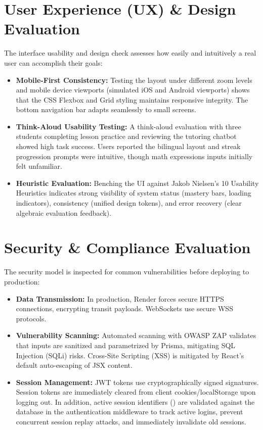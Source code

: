 \section{User Experience (UX) \& Design Evaluation}

The interface usability and design check assesses how easily and intuitively a real user can accomplish their goals:
\begin{itemize}
  \item \textbf{Mobile-First Consistency:} Testing the layout under different zoom levels and mobile device viewports (simulated iOS and Android viewports) shows that the CSS Flexbox and Grid styling maintains responsive integrity. The bottom navigation bar adapts seamlessly to small screens.
  \item \textbf{Think-Aloud Usability Testing:} A think-aloud evaluation with three students completing lesson practice and reviewing the tutoring chatbot showed high task success. Users reported the bilingual layout and streak progression prompts were intuitive, though math expressions inputs initially felt unfamiliar.
  \item \textbf{Heuristic Evaluation:} Benching the UI against Jakob Nielsen's 10 Usability Heuristics indicates strong visibility of system status (mastery bars, loading indicators), consistency (unified design tokens), and error recovery (clear algebraic evaluation feedback).
\end{itemize}

\section{Security \& Compliance Evaluation}

The security model is inspected for common vulnerabilities before deploying to production:
\begin{itemize}
  \item \textbf{Data Transmission:} In production, Render forces secure HTTPS connections, encrypting transit payloads. WebSockets use secure WSS protocols.
  \item \textbf{Vulnerability Scanning:} Automated scanning with OWASP ZAP validates that inputs are sanitized and parametrized by Prisma, mitigating SQL Injection (SQLi) risks. Cross-Site Scripting (XSS) is mitigated by React's default auto-escaping of JSX content.
  \item \textbf{Session Management:} JWT tokens use cryptographically signed signatures. Session tokens are immediately cleared from client cookies/localStorage upon logging out. In addition, active session identifiers () are validated against the database in the authentication middleware to track active logins, prevent concurrent session replay attacks, and immediately invalidate old sessions.
\end{itemize}

